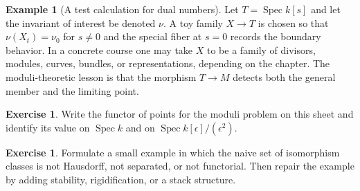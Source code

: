 \documentclass[11pt]{amsart}
\theoremstyle{definition}
\newtheorem{example}[theorem]{Example}
\newtheorem{exercise}[theorem]{Exercise}
\newcommand{\Spec}{\operatorname{Spec}}
\begin{document}
\begin{example}[A test calculation for dual numbers]
Let $T=\Spec k[s]$ and let the invariant of interest be denoted $\nu$.  A toy family $X\to T$ is chosen so that $\nu(X_t)=\nu_0$ for $s\ne0$ and the special fiber at $s=0$ records the boundary behavior.  In a concrete course one may take $X$ to be a family of divisors, modules, curves, bundles, or representations, depending on the chapter.  The moduli-theoretic lesson is that the morphism $T\to M$ detects both the general member and the limiting point.
\end{example}
\begin{exercise}
Write the functor of points for the moduli problem on this sheet and identify its value on $\Spec k$ and on $\Spec k[\epsilon]/(\epsilon^2)$.
\end{exercise}
\begin{exercise}
Formulate a small example in which the naive set of isomorphism classes is not Hausdorff, not separated, or not functorial.  Then repair the example by adding stability, rigidification, or a stack structure.
\end{exercise}
\clearpage
\end{document}
